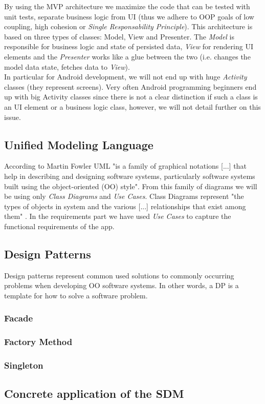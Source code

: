 \documentclass{article}[11]
\begin{document}
	 By using the \ac{MVP} architecture we maximize the code that can be tested with unit tests, separate business logic from UI (thus we adhere to OOP goals of low coupling, high cohesion or \emph{Single Responsability Principle}).  This architecture is based on three types of classes: Model, View and Presenter. The \emph{Model} is responsible for business logic and state of persisted data, \emph{View} for rendering UI elements and the \emph{Presenter} works like a glue between the two (i.e. changes the model data state, fetches data to \emph{View}).\\
	
	 In particular for Android development, we will not end up with huge \emph{Activity} classes (they represent screens). Very often Android programming beginners end up with big Activity classes since there is not a clear distinction if such a class is an UI element or a business logic class, however, we will not detail further on this issue.
	
	\subsection{Unified Modeling Language}
	According to Martin Fowler \cite{fowler2004uml} \ac{UML} "is a family of graphical notations [...] that help in describing and designing software systems, particularly software systems built using the object-oriented (OO) style". From this family of diagrams we will be using only \emph{Class Diagrams}  and \emph{Use Cases}. Class Diagrams represent "the types of objects in system and the various [...] relationships that exist among them" . In the requirements  part we have used \emph{Use Cases} to capture the functional requirements of the app.
	\subsection{Design Patterns}
	Design patterns represent common used solutions to commonly occurring  problems when developing OO software systems. In other words, a DP is a template for how to solve a software problem.
	\subsubsection{Facade}
	\subsubsection{Factory Method}
	\subsubsection{Singleton}

\subsection{Concrete application of the SDM}

\printacronyms[include-classes=abbrev,name=Abbreviations]




\end{document}
